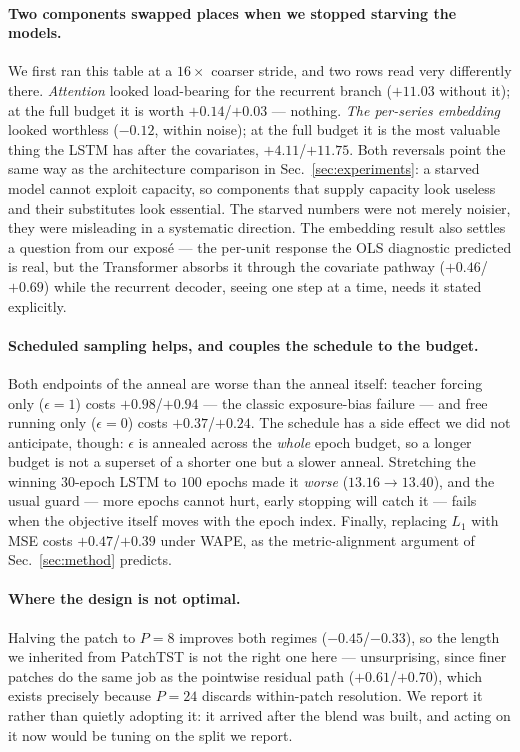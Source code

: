 \documentclass[10pt,twocolumn]{article}
\begin{document}
\paragraph{Two components swapped places when we stopped starving the models.} We
first ran this table at a $16\times$ coarser stride, and two rows read very
differently there. \emph{Attention} looked load-bearing for the recurrent branch
($+11.03$ without it); at the full budget it is worth $+0.14$/$+0.03$ --- nothing.
\emph{The per-series embedding} looked worthless ($-0.12$, within noise); at the
full budget it is the most valuable thing the LSTM has after the covariates,
$+4.11$/$+11.75$. Both reversals point the same way as the architecture comparison
in Sec.~\ref{sec:experiments}: a starved model cannot exploit capacity, so
components that supply capacity look useless and their substitutes look essential.
The starved numbers were not merely noisier, they were misleading in a systematic
direction. The embedding result also settles a question from our expos\'e --- the
per-unit response the OLS diagnostic predicted is real, but the Transformer absorbs
it through the covariate pathway ($+0.46$/$+0.69$) while the recurrent decoder,
seeing one step at a time, needs it stated explicitly.

\paragraph{Scheduled sampling helps, and couples the schedule to the budget.}
Both endpoints of the anneal are worse than the anneal itself: teacher forcing only
($\epsilon=1$) costs $+0.98$/$+0.94$ --- the classic exposure-bias failure --- and
free running only ($\epsilon=0$) costs $+0.37$/$+0.24$. The schedule has a side
effect we did not anticipate, though: $\epsilon$ is annealed across the
\emph{whole} epoch budget, so a longer budget is not a superset of a shorter one but
a slower anneal. Stretching the winning $30$-epoch LSTM to $100$ epochs made it
\emph{worse} ($13.16 \rightarrow 13.40$), and the usual guard --- more epochs cannot
hurt, early stopping will catch it --- fails when the objective itself moves with
the epoch index. Finally, replacing $L_1$ with MSE costs $+0.47$/$+0.39$ under WAPE,
as the metric-alignment argument of Sec.~\ref{sec:method} predicts.

\paragraph{Where the design is not optimal.} Halving the patch to $P=8$ improves
both regimes ($-0.45$/$-0.33$), so the length we inherited from PatchTST is not the
right one here --- unsurprising, since finer patches do the same job as the
pointwise residual path ($+0.61$/$+0.70$), which exists precisely because $P=24$
discards within-patch resolution. We report it rather than quietly adopting it: it
arrived after the blend was built, and acting on it now would be tuning on the
split we report.
\end{document}
